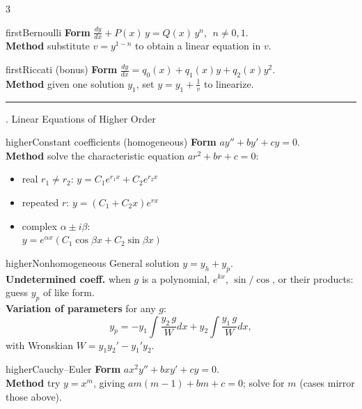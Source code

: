 \documentclass[10pt]{article}
\newcommand{\lab}[1]{\textcolor{ink}{\sffamily\footnotesize\textbf{#1}}\;}
\newcommand{\dydx}{\frac{dy}{dx}}
\newcommand{\sect}[2]{%
  \begin{tcolorbox}[blanker, breakable, before skip=2pt, after skip=2pt]
    \begingroup\sffamily\bfseries\normalsize\color{#1}%
    {\color{#1}\rule[-1pt]{3pt}{12pt}}\;#2\endgroup
    \par\vspace{1pt}{\color{#1}\hrule height 1pt}
\end{tcolorbox}}
\begin{document}
\begin{multicols}{3}
  \begin{card}{first}{Bernoulli}
    \lab{Form} $\dydx+P(x)\,y=Q(x)\,y^{n}$, $\;n\neq0,1$.\\
    \lab{Method} substitute $v=y^{1-n}$ to obtain a linear equation in $v$.
  \end{card}

  \begin{card}{first}{Riccati \small(bonus)}
    \lab{Form} $\dydx=q_0(x)+q_1(x)y+q_2(x)y^2$.\\
    \lab{Method} given one solution $y_1$, set $y=y_1+\frac1v$ to linearize.
  \end{card}

  \columnbreak
  \sect{higher}{3.\; Linear Equations of Higher Order}

  \begin{card}{higher}{Constant coefficients (homogeneous)}
    \lab{Form} $ay''+by'+cy=0$.\\
    \lab{Method} solve the characteristic equation $ar^2+br+c=0$:
    \begin{itemize}
      \item real $r_1\neq r_2$:\; $y=C_1e^{r_1x}+C_2e^{r_2x}$
      \item repeated $r$:\; $y=(C_1+C_2x)e^{rx}$
      \item complex $\alpha\pm i\beta$:\\ $y=e^{\alpha x}(C_1\cos\beta x+C_2\sin\beta x)$
    \end{itemize}
  \end{card}

  \begin{card}{higher}{Nonhomogeneous}
    General solution $y=y_h+y_p$.\\[2pt]
    \lab{Undetermined coeff.} when $g$ is a polynomial, $e^{kx}$, $\sin/\cos$, or their products: guess $y_p$ of like form.\\[2pt]
    \lab{Variation of parameters} for any $g$:
    \[
      y_p=-y_1\!\int\!\frac{y_2\,g}{W}dx+y_2\!\int\!\frac{y_1\,g}{W}dx,
    \]
    with Wronskian $W=y_1y_2'-y_1'y_2$.
  \end{card}

  \begin{card}{higher}{Cauchy--Euler}
    \lab{Form} $ax^2y''+bxy'+cy=0$.\\
    \lab{Method} try $y=x^{m}$, giving $am(m-1)+bm+c=0$; solve for $m$ (cases mirror those above).
  \end{card}


\end{multicols}
\end{document}
